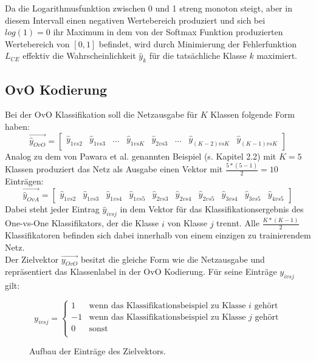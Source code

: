 Da die Logarithmusfunktion zwischen 0 und 1 streng monoton steigt, aber in diesem Intervall einen negativen Wertebereich produziert und sich bei\\ $log(1)=0$ ihr Maximum in dem von der Softmax Funktion produzierten Wertebereich von $[0, 1]$ befindet, wird durch Minimierung der Fehlerfunktion $L_{CE}$ effektiv die Wahrscheinlichkeit $\widehat{y}_k$ für die tatsächliche Klasse $k$ maximiert.


\subsection{OvO Kodierung}
Bei der OvO Klassifikation soll die Netzausgabe für $K$ Klassen folgende Form haben:
\[\overrightarrow{\widehat{y}_{OvO}} = \begin{bmatrix}
\widehat{y}_{1vs2} & \widehat{y}_{1vs3} & ... & \widehat{y}_{1vsK} & \widehat{y}_{2vs3} &... & \widehat{y}_{(K-2)vs K} & \widehat{y}_{(K-1)vsK}
\end{bmatrix} \]
Analog zu dem von Pawara et al. genannten Beispiel (s. \cite{pawaraPaper} Kapitel 2.2) mit $K=5$ Klassen produziert das Netz als Ausgabe einen Vektor mit $\frac{5*(5-1)}{2}=10$ Einträgen:
\[\overrightarrow{\widehat{y}_{OvA}} = \begin{bmatrix}
\widehat{y}_{1vs2} & \widehat{y}_{1vs3} & \widehat{y}_{1vs4} & \widehat{y}_{1vs5} & \widehat{y}_{2vs3} & \widehat{y}_{2vs4} & \widehat{y}_{2vs5} & \widehat{y}_{3vs4} & \widehat{y}_{3vs5} & \widehat{y}_{4vs5}
\end{bmatrix} \]
Dabei steht jeder Eintrag $\widehat{y}_{ivsj}$ in dem Vektor für das Klassifikationsergebnis des One-vs-One Klassifikators, der die Klasse $i$ von Klasse $j$ trennt. Alle $\frac{K*(K-1)}{2}$ Klassifikatoren befinden sich dabei innerhalb von einem einzigen zu trainierendem Netz.\\

Der Zielvektor $\overrightarrow{y_{OvO}}$ besitzt die gleiche Form wie die Netzausgabe und repräsentiert das Klassenlabel in der OvO Kodierung. Für seine Einträge $y_{ivsj}$ gilt:
\begin{figure}[H]
\[
y_{ivsj} = 
\begin{cases}
1 & \text{wenn das Klassifikationsbeispiel zu Klasse } i \text{ gehört}\\
-1 & \text{wenn das Klassifikationsbeispiel zu Klasse } j \text{ gehört}\\
0 & \text{sonst}\\
\end{cases}
\]
\caption{Aufbau der Einträge des Zielvektors.}
\label{gl:OvOZielvektor}
\end{figure}

